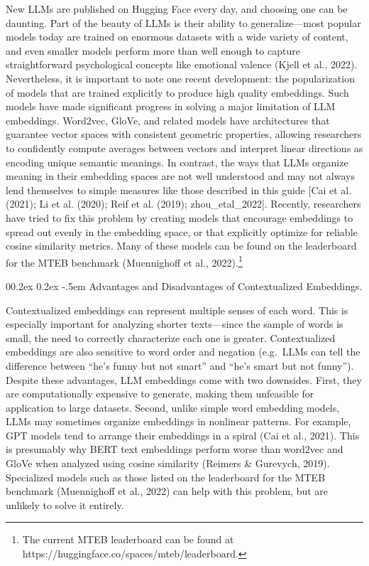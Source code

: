 \documentclass[
  man,
  floatsintext,
  longtable,
  nolmodern,
  notxfonts,
  notimes,
  colorlinks=true,linkcolor=blue,citecolor=blue,urlcolor=blue]{apa7}
\makeatletter
\renewcommand{\paragraph}{\@startsection{paragraph}{4}{\parindent}%
	{0\baselineskip \@plus 0.2ex \@minus 0.2ex}%
	{-.5em}%
	{\normalfont\normalsize\bfseries\typesectitle}}
\makeatother
\begin{document}
New LLMs are published on Hugging Face every day, and choosing one can
be daunting. Part of the beauty of LLMs is their ability to
generalize---most popular models today are trained on enormous datasets
with a wide variety of content, and even smaller models perform more
than well enough to capture straightforward psychological concepts like
emotional valence (Kjell et al., 2022). Nevertheless, it is important to
note one recent development: the popularization of models that are
trained explicitly to produce high quality embeddings. Such models have
made significant progress in solving a major limitation of LLM
embeddings. Word2vec, GloVe, and related models have architectures that
guarantee vector spaces with consistent geometric properties, allowing
researchers to confidently compute averages between vectors and
interpret linear directions as encoding unique semantic meanings. In
contrast, the ways that LLMs organize meaning in their embedding spaces
are not well understood and may not always lend themselves to simple
measures like those described in this guide {[}Cai et al. (2021); Li et
al. (2020); Reif et al. (2019); zhou\_etal\_2022{]}. Recently,
researchers have tried to fix this problem by creating models that
encourage embeddings to spread out evenly in the embedding space, or
that explicitly optimize for reliable cosine similarity metrics. Many of
these models can be found on the leaderboard for the MTEB benchmark
(Muennighoff et al., 2022).\footnote{The current MTEB leaderboard can be
  found at https://huggingface.co/spaces/mteb/leaderboard.}

\paragraph{Advantages and Disadvantages of Contextualized
Embeddings.}\label{advantages-and-disadvantages-of-contextualized-embeddings}

Contextualized embeddings can represent multiple senses of each word.
This is especially important for analyzing shorter texts---since the
sample of words is small, the need to correctly characterize each one is
greater. Contextualized embeddings are also sensitive to word order and
negation (e.g.~LLMs can tell the difference between ``he's funny but not
smart'' and ``he's smart but not funny''). Despite these advantages, LLM
embeddings come with two downsides. First, they are computationally
expensive to generate, making them unfeasible for application to large
datasets. Second, unlike simple word embedding models, LLMs may
sometimes organize embeddings in nonlinear patterns. For example, GPT
models tend to arrange their embeddings in a spiral (Cai et al., 2021).
This is presumably why BERT text embeddings perform worse than word2vec
and GloVe when analyzed using cosine similarity (Reimers \& Gurevych,
2019). Specialized models such as those listed on the leaderboard for
the MTEB benchmark (Muennighoff et al., 2022) can help with this
problem, but are unlikely to solve it entirely.
\end{document}
